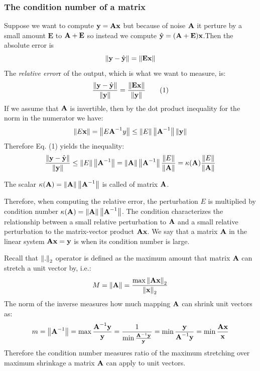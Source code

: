 \documentclass[a4paper]{article}
\begin{document}



\subsubsection{The condition number of a matrix}

Suppose we want to compute $\textbf{y} = \textbf{A} \textbf{x}$ but because of noise $\textbf{A}$ it perture by a small amount $\textbf{E}$ to $\textbf{A} + \textbf{E}$ so instead we compute $\hat{\textbf{y}} = (\textbf{A} + \textbf{E})\textbf{x}$.Then the absolute error is
\begin{equation*}
	\left\lVert\textbf{y} - \hat{\textbf{y}}\right\rVert= \left\lVert\textbf{Ex}\right\rVert
\end{equation*}
The \textit{relative error}r of the output, which is what we want to measure, is:
\begin{equation}
	\frac{\left\lVert\textbf{y} - \hat{\textbf{y}}\right\rVert}{\left\lVert\textbf{y}\right\rVert} = \frac{\left\lVert\textbf{Ex}\right\rVert}{\left\lVert\textbf{y}\right\rVert} \tag{1}
\end{equation}
If we assume that $\textbf{A}$ is invertible, then by the dot product inequality for the norm in the numerator we have:
\begin{equation*}
	\left\lVert E \textbf{x}\right\rVert = \left\lVert E \textbf{A}^{-1}y\right\rVert \leq \left\lVert E\right\rVert \left\lVert\textbf{A}^{-1}\right\rVert\left\lVert\textbf{y}\right\rVert	
\end{equation*}
Therefore Eq. (1) yields the inequality:
\begin{equation*}
	\frac{\left\lVert\textbf{y} - \hat{\textbf{y}}\right\rVert}{\left\lVert\textbf{y}\right\rVert}  \leq \left\lVert E\right\rVert\left\lVert\textbf{A}^{-1}\right\rVert = \left\lVert\textbf{A}\right\rVert\left\lVert\textbf{A}^{-1}\right\rVert \frac{\left\lVert E\right\rVert}{\left\lVert\textbf{A}\right\rVert} = \kappa(\textbf{A})  \frac{\left\lVert E\right\rVert}{\left\lVert\textbf{A}\right\rVert} 
\end{equation*}
\begin{definition}
The scalar $\kappa(\textbf{A}) = \left\lVert\textbf{A}\right\rVert\left\lVert\textbf{A}^{-1}\right\rVert$ is called  of matrix $\textbf{A}$.
\end{definition}
Therefore, when computing the relative error, the perturbation $E$ is multiplied by condition number $\kappa(\textbf{A}) = \left\lVert\textbf{A}\right\rVert\left\lVert\textbf{A}^{-1}\right\rVert$. The condition 
 characterizes the relationship between a small relative perturbation to $\textbf{A}$ and a small relative perturbation to the matrix-vector product $\textbf{A}\textbf{x}$. We say that a matrix $\textbf{A}$ in the linear system $\textbf{A}\textbf{x} = \textbf{y}$ is  when  its condition number is large.

Recall that $\left\lVert.\right\rVert_2$ operator is defined as the maximum amount that matrix $\textbf{A}$ can stretch a unit vector by, i.e.:
\begin{equation*}
	M = \left\lVert\textbf{A}\right\rVert = 	
    \frac{{\max}\left\lVert\textbf{Ax}\right\rVert_2}{\left\lVert\textbf{x}\right\rVert_2}
\end{equation*}
The norm of the inverse measures how much mapping $\textbf{A}$ can shrink unit vectors as:
\begin{equation*}
	m = \left\lVert\textbf{A}^{-1}\right\rVert = \max\frac{\textbf{A}^{-1}\textbf{y}}{\textbf{y}} = \frac{1}{ \min\frac{\textbf{A}^{-1}\textbf{y}}{\textbf{y}}} = \min \frac{\textbf{y}}{\textbf{A}^{-1}\textbf{y}}=\min \frac{\textbf{A} \textbf{x}}{\textbf{x}} 
\end{equation*}
Therefore the condition number measures ratio of the maximum stretching over maximum shrinkage a matrix $\textbf{A}$ can apply to unit vectors. 
\end{document}
